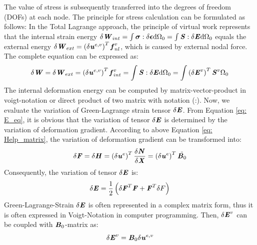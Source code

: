 The value of stress is subsequently transferred into the degrees of freedom (DOFs) at each node. The principle for stress calculation can be formulated as follows:
In the Total Lagrange approach, the principle of virtual work represents that the internal strain energy $\delta \textbf{\textit{W}}_{int} = \int \boldsymbol{\sigma} : \delta \boldsymbol{\epsilon} \mathrm{d}\Omega_0 = \int \textbf{\textit{S}} : \delta \textbf{\textit{E}} \mathrm{d}\Omega_0$ equals the external energy $\delta \textbf{\textit{W}}_{ext} = \left(\delta \textbf{\textit{u}}^{e,v}\right)^T \textbf{\textit{f}}_{nl}^v$, which is caused by external nodal force. The complete equation can be expressed as:
\begin{equation} \label{eq: W}
\delta \textbf{\textit{W}} = \delta \textbf{\textit{W}}_{ext} = \left(\delta \textbf{\textit{u}}^{e,v}\right)^T \textbf{\textit{f}}_{int}^v = \int \textbf{\textit{S}} : \delta \textbf{\textit{E}} \mathrm{d}\Omega_0 = \int \left( \delta \textbf{\textit{E}}^v\right)^T \textbf{\textit{S}}^v \mathrm{\Omega_0}
\end{equation}
The internal deformation energy can be computed by matrix-vector-product in voigt-notation or direct product of two matrix with notation (:). Now, we evaluate the variation of Green-Lagrange strain tensor $\delta \textbf{\textit{E}}$. From Equation \ref{eq: E_eq}, it is obvious that the variation of tensor $\delta \textbf{\textit{E}}$ is determined by the variation of deformation gradient. According to above Equation \ref{eq: Help_matrix}, the variation of deformation gradient can be transformed into:
\begin{equation}
\delta \textbf{\textit{F}} = \delta \textbf{\textit{H}} = \left(\delta \textbf{\textit{u}}^e\right)^T \frac{\delta \textbf{\textit{N}}}{\delta \textbf{\textit{X}}} = \left(\delta \textbf{\textit{u}}^e\right)^T \tilde{\textbf{\textit{B}}_0}
\end{equation}
Consequently, the variation of tensor $\delta \textbf{\textit{E}}$ is:
\begin{equation}
\delta \textbf{\textit{E}} = \frac{1}{2} \left(\delta \textbf{\textit{F}}^T \textbf{\textit{F}} + \textbf{\textit{F}}^T \delta F \right)
\end{equation}
Green-Lagrange-Strain $\delta \textbf{\textit{E}}$ is often represented in a complex matrix form, thus it is often expressed in Voigt-Notation in computer programming. Then, $\delta \textbf{\textit{E}}^v$ can be coupled with $\textbf{\textit{B}}_0$-matrix as:
\begin{equation} \label{eq: E_voigt}
\delta \textbf{\textit{E}}^v = \textbf{\textit{B}}_0 \delta \textbf{\textit{u}}^{e,v}
\end{equation} 
